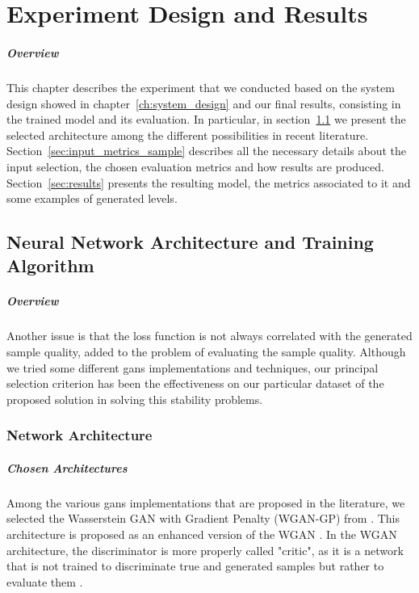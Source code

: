 \chapter{Experiment Design and Results}
\label{ch:experiment}

\paragraph{Overview} 
 This chapter describes the experiment that we conducted based on the system design showed in chapter~\ref{ch:system_design} and our final results, consisting in the trained model and its evaluation. In particular, in section~\ref{sec:nn} we present the selected architecture among the different possibilities in recent literature. Section~\ref{sec:input_metrics_sample} describes all the necessary details about the input selection, the chosen evaluation metrics and how results are produced. Section~\ref{sec:results} presents the resulting model, the metrics associated to it and some examples of generated levels. 
\section{Neural Network Architecture and Training Algorithm}
\label{sec:nn}
\paragraph{Overview} Another issue is that the loss function is not always correlated with the generated sample quality, added to the problem of evaluating the sample quality. %
 Although we tried some different \glspl{gan} implementations and techniques, our principal selection criterion has been the effectiveness on our particular dataset of the proposed solution in solving this stability problems.
\subsection{Network Architecture}
\label{sec:networkarch}

\paragraph{Chosen Architectures} Among the various \glspl{gan} implementations that are proposed in the literature, we selected the Wasserstein GAN with Gradient Penalty \cite{wgangp} (WGAN-GP) from \citeauthor{wgangp}. This architecture is proposed as an enhanced version of the WGAN \cite{wgan}. In the WGAN architecture, the discriminator is more properly called "critic", as it is a network that is not trained to discriminate true and generated samples but rather to evaluate them \cite[section 2.2, p.~2]{wgangp}.



